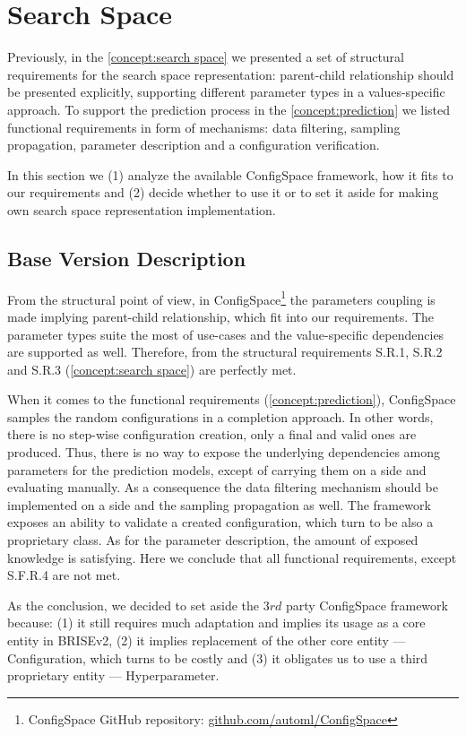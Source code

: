 \section{Search Space}\label{impl: search space}
Previously, in the \cref{concept:search space} we presented a set of structural requirements for the search space representation: parent-child relationship should be presented explicitly, supporting different parameter types in a values-specific approach. To support the prediction process in the \cref{concept:prediction} we listed functional requirements in form of mechanisms: data filtering, sampling propagation, parameter description and a configuration verification.

In this section we (1) analyze the available ConfigSpace framework, how it fits to our requirements and (2) decide whether to use it or to set it aside for making own search space representation implementation.

\subsection{Base Version Description}
From the structural point of view, in ConfigSpace\footnote{ConfigSpace GitHub repository: \url{github.com/automl/ConfigSpace}} the parameters coupling is made implying parent-child relationship, which fit into our requirements. The parameter types suite the most of use-cases and the value-specific dependencies are supported as well. Therefore, from the structural requirements S.R.1, S.R.2 and S.R.3 (\cref{concept:search space}) are perfectly met.

When it comes to the functional requirements (\cref{concept:prediction}), ConfigSpace samples the random configurations in a completion approach. In other words, there is no step-wise configuration creation, only a final and valid ones are produced. Thus, there is no way to expose the underlying dependencies among parameters for the prediction models, except of carrying them on a side and evaluating manually. As a consequence the data filtering mechanism should be implemented on a side and the sampling propagation as well. The framework exposes an ability to validate a created configuration, which turn to be also a proprietary class. As for the parameter description, the amount of exposed knowledge is satisfying. Here we conclude that all functional requirements, except S.F.R.4 are not met.

As the conclusion, we decided to set aside the $3rd$ party ConfigSpace framework because: (1) it still requires much adaptation and implies its usage as a core entity in BRISEv2, (2) it implies replacement of the other core entity — Configuration, which turns to be costly and (3) it obligates us to use a third proprietary entity — Hyperparameter. 

